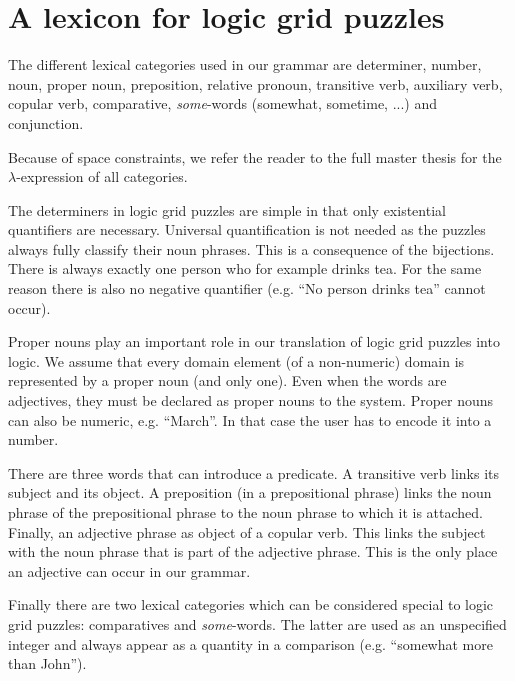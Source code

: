 \section{A lexicon for logic grid puzzles}
The different lexical categories used in our grammar are determiner, number, noun, proper noun, preposition, relative pronoun, transitive verb, auxiliary verb, copular verb, comparative, \textit{some}-words (somewhat, sometime, ...) and conjunction.

Because of space constraints, we refer the reader to the full master thesis for the $\lambda$-expression of all categories.

The determiners in logic grid puzzles are simple in that only existential quantifiers are necessary. Universal quantification is not needed as the puzzles always fully classify their noun phrases. This is a consequence of the bijections. There is always exactly one person who for example drinks tea. For the same reason there is also no negative quantifier (e.g. ``No person drinks tea'' cannot occur).

Proper nouns play an important role in our translation of logic grid puzzles into logic. We assume that every domain element (of a non-numeric) domain is represented by a proper noun (and only one). Even when the words are adjectives, they must be declared as proper nouns to the system.
Proper nouns can also be numeric, e.g. ``March''. In that case the user has to encode it into a number.

There are three words that can introduce a predicate. A transitive verb links its subject and its object. A preposition (in a prepositional phrase) links the noun phrase of the prepositional phrase to the noun phrase to which it is attached. Finally, an adjective phrase as object of a copular verb. This links the subject with the noun phrase that is part of the adjective phrase. This is the only place an adjective can occur in our grammar.



Finally there are two lexical categories which can be considered special to logic grid puzzles: comparatives and \textit{some}-words. The latter are used as an unspecified integer and always appear as a quantity in a comparison (e.g. ``somewhat more than John'').
